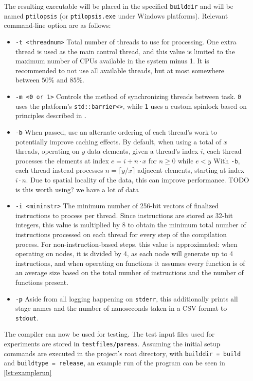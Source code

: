 \documentclass[12pt,dvipsnames]{article}
\newcommand{\helpme}[1]{{\color{red}#1}}
\newcommand{\icpp}[1]{\texttt{#1}}
\newcommand{\mono}[1]{\texttt{#1}}
\begin{document}
The resulting executable will be placed in the specified \mono{builddir} and will be named \mono{ptilopsis} (or \mono{ptilopsis.exe} under Windows platforms). Relevant command-line option are as follows:
\begin{itemize}
    \item \mono{-t <threadnum>} Total number of threads to use for processing.
        One extra thread is used as the main control thread, and this value is limited to the maximum number of CPUs available in the system minus 1. It is recommended to not use all available threads, but at most somewhere between $50\%$ and $85\%$.
    \item \mono{-m <0 or 1>} Controls the method of synchronizing threads between task. \mono{0} uses the platform's \icpp{std::barrier<>}, while \mono{1} uses a custom spinlock based on principles described in \cite{spinlock}.
    \item \mono{-b} When passed, use an alternate ordering of each thread's work to potentially improve caching effects.
    By default, when using a total of $x$ threads, operating on $y$ data elements, given a thread's index $i$, each thread processes the elements at index $e = i + n \cdot x$ for $n \geq 0$ while $e < y$
    With \mono{-b}, each thread instead processes $n = \lceil y / x \rceil$ adjacent elements, starting at index $i \cdot n$. Due to spatial locality of the data, this can improve performance.
    \helpme{TODO is this worth using? we have a lot of data}
    \item \mono{-i <mininstr>} The minimum number of 256-bit vectors of finalized instructions to process per thread. Since instructions are stored as 32-bit integers, this value is multiplied by 8 to obtain the minimum total number of instructions processed on each thread for every step of the compilation process. For non-instruction-based steps, this value is approximated: when operating on nodes, it is divided by 4, as each node will generate up to 4 instructions, and when operating on functions it assumes every function is of an average size based on the total number of instructions and the number of functions present.
    \item \mono{-p} Aside from all logging happening on \mono{stderr}, this additionally prints all stage names and the number of nanoseconds taken in a CSV format to \mono{stdout}.
\end{itemize}

The compiler can now be used for testing. The test input files used for experiments are stored in \mono{testfiles/pareas}. Assuming the initial setup commands are executed in the project's root directory, with  \mono{builddir = build} and \mono{buildtype = release}, an example run of the program can be seen in \autoref{lst:examplerun}
\end{document}
